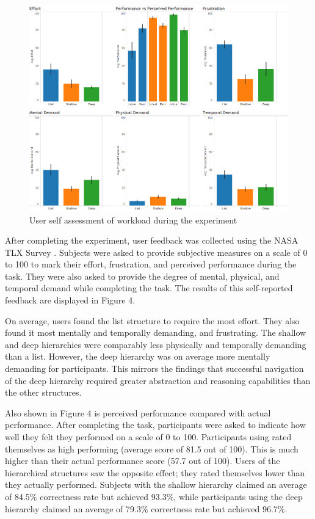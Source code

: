 \documentclass{sigchi}
\begin{document}
\begin{figure}[!h]
    \centering
    \includegraphics[width=0.9\columnwidth]{fig_nasaSummary}
    \caption{User self assessment of workload during the experiment}
    \label{fig: Figure4}
\end{figure}

After completing the experiment, user feedback was collected using the NASA TLX Survey \cite{NASA1986}. Subjects were asked to provide subjective measures on a scale of 0 to 100 to mark their effort, frustration, and perceived performance during the task. They were also asked to provide the degree of mental, physical, and temporal demand while completing the task. The results of this self-reported feedback are displayed in Figure 4.


On average, users found the list structure to require the most effort. They also found it most mentally and temporally demanding, and frustrating. The shallow and deep hierarchies were comparably less physically and temporally demanding than a list. However, the deep hierarchy was on average more mentally demanding for participants. This mirrors the findings \cite{Medhi2013a} that successful navigation of the deep hierarchy required greater abstraction and reasoning capabilities than the other structures.

Also shown in Figure 4 is perceived performance compared with actual performance. After completing the task, participants were asked to indicate how well they felt they performed on a scale of 0 to 100. Participants using rated themselves as high performing (average score of 81.5 out of 100). This is much higher than their actual performance score (57.7 out of 100). Users of the hierarchical structures saw the opposite effect; they rated themselves lower than they actually performed. Subjects with the shallow hierarchy claimed an average of 84.5\% correctness rate but achieved 93.3\%, while participants using the deep hierarchy claimed an average of 79.3\% correctness rate but achieved 96.7\%.
\end{document}
